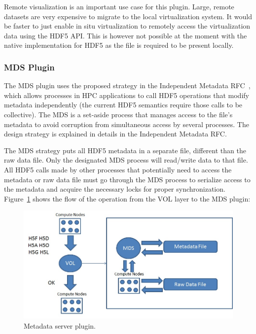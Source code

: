 \documentclass[letterpaper,hyper]{THG_RFC}
\begin{document}
Remote visualization is an important use case for this plugin. Large, remote datasets are very expensive to migrate to the local virtualization system. It would be faster to just enable in situ virtualization to remotely access the virtualization data using the HDF5 API. This is however not possible at the moment with the native implementation for HDF5 as the file is required to be present locally.

\subsubsection{MDS Plugin}
The MDS plugin uses the proposed strategy in the Independent Metadata RFC~\cite{mds}, which allows processes in HPC applications to call HDF5 operations that modify metadata independently (the current HDF5 semantics require those calls to be collective). The MDS is a set-aside process that manages access to the file's metadata to avoid corruption from simultaneous access by several processes. The design strategy is explained in details in the Independent Metadata RFC.

The MDS strategy puts all HDF5 metadata in a separate file, different than the raw data file. Only the designated MDS process will read/write data to that file. All HDF5 calls made by other processes that potentially need to access the metadata or raw data file must go through the MDS process to serialize access to the metadata and acquire the necessary locks for proper synchronization. Figure~\ref{fig:mds} shows the flow of the operation from the VOL layer to the MDS plugin:

\begin{figure}[ht!]
\centering
\includegraphics[width=170mm]{pics/plugin-mds.jpg}
\caption{Metadata server plugin.}
\label{fig:mds}
\end{figure}
\end{document}

